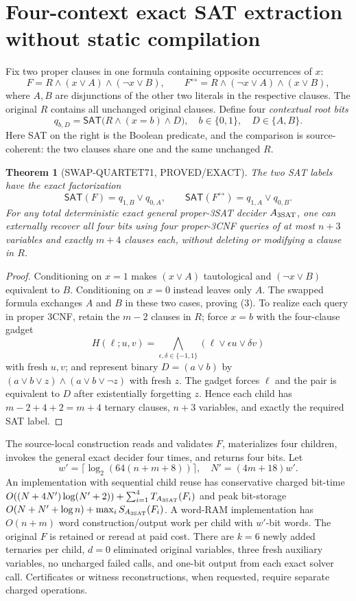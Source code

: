 \documentclass[11pt]{article}
\newtheorem{theorem}{Theorem}
\newcommand{\SAT}{\mathsf{SAT}}
\begin{document}
\section{Four-context exact SAT extraction without static compilation}
Fix two proper clauses in one formula containing opposite occurrences of $x$:
\[
 F=R\land(x\lor A)\land(\neg x\lor B),\qquad
 F^\leftrightarrow=R\land(\neg x\lor A)\land(x\lor B),
\]
where $A,B$ are disjunctions of the other two literals in the respective clauses. The original $R$ contains all unchanged original clauses. Define four \emph{contextual root bits}
\[
 q_{b,D}=\SAT\bigl(R\land(x=b)\land D\bigr),
 \quad b\in\{0,1\},\quad D\in\{A,B\}.
\]
Here SAT on the right is the Boolean predicate, and the comparison is source-coherent: the two clauses share one and the same unchanged $R$.

\begin{theorem}[SWAP-QUARTET71, PROVED/EXACT]
The two SAT labels have the exact factorization
\[
 \SAT(F)=q_{1,B}\lor q_{0,A},\qquad
 \SAT(F^\leftrightarrow)=q_{1,A}\lor q_{0,B}.
\tag{3}
\]
For any total deterministic exact \emph{general proper-3SAT} decider $A_{\rm 3SAT}$, one can externally recover all four bits using four proper-3CNF queries of at most $n+3$ variables and exactly $m+4$ clauses each, without deleting or modifying a clause in $R$.
\end{theorem}
\begin{proof}
Conditioning on $x=1$ makes $(x\lor A)$ tautological and $(\neg x\lor B)$ equivalent to $B$. Conditioning on $x=0$ instead leaves only $A$. The swapped formula exchanges $A$ and $B$ in these two cases, proving (3). To realize each query in proper 3CNF, retain the $m-2$ clauses in $R$; force $x=b$ with the four-clause gadget
\[
 H(\ell;u,v)=\bigwedge_{\epsilon,\delta\in\{-1,1\}}
       (\ell\lor\epsilon u\lor\delta v)
\]
with fresh $u,v$; and represent binary $D=(a\lor b)$ by
$(a\lor b\lor z)\land(a\lor b\lor\neg z)$ with fresh $z$.
The gadget forces $\ell$ and the pair is equivalent to $D$ after existentially forgetting $z$. Hence each child has $m-2+4+2=m+4$ ternary clauses, $n+3$ variables, and exactly the required SAT label.
\end{proof}
The source-local construction reads and validates $F$, materializes four children, invokes the general exact decider four times, and returns four bits. Let
\[
 w'=\lceil\log_2(64(n+m+8))\rceil,\quad N'=(4m+18)w'.
\]
An implementation with sequential child reuse has conservative charged bit-time
$O((N+4N')\log(N'+2))+\sum_{i=1}^4T_{A_{\rm 3SAT}}(F_i)$
and peak bit-storage
$O(N+N'+\log n)+\max_iS_{A_{\rm 3SAT}}(F_i)$.
A word-RAM implementation has $O(n+m)$ word construction/output work per child with $w'$-bit words. The original $F$ is retained or reread at paid cost. There are $k=6$ newly added ternaries per child, $d=0$ eliminated original variables, three fresh auxiliary variables, no uncharged failed calls, and one-bit output from each exact solver call. Certificates or witness reconstructions, when requested, require separate charged operations.
\end{document}
